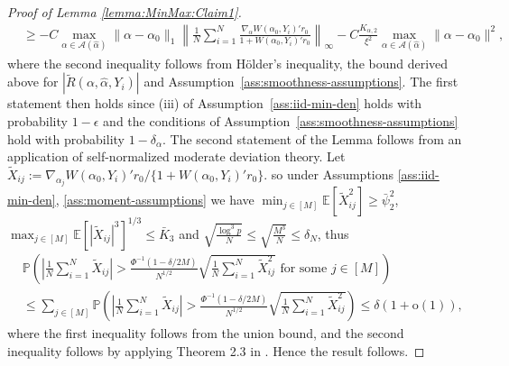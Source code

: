 \documentclass[11pt]{article}
\begin{document}
\begin{proof}[Proof of Lemma \ref{lemma:MinMax:Claim1}]
$$\begin{array}{rl}
&\displaystyle \geq -C\max_{\alpha \in \mathcal{A}(\hat\alpha)} \|\alpha-\alpha_0\|_1 \left\|\frac{1}{N}\sum_{i=1}^N \frac{\nabla_\alpha W(\alpha_0,Y_i)'r_0}{1+W(\alpha_0,Y_i)'r_0}  \right\|_\infty - C\frac{K_{\alpha,2}}{\xi^2}\max_{\alpha \in \mathcal{A}(\hat\alpha)} \|\alpha-\alpha_0\|^2,
\end{array}$$
where the second inequality follows from H\"older's inequality, the bound derived above for $|\widetilde R(\alpha,\hat\alpha,Y_i)|$ and Assumption~\ref{ass:smoothness-assumptions}. The first statement then holds since (iii) of Assumption~\ref{ass:iid-min-den} holds with probability $1-\epsilon$ and the conditions of Assumption~\ref{ass:smoothness-assumptions} hold with probability $1-\delta_{\alpha}$. The second statement of the Lemma follows from an application of self-normalized moderate deviation theory.  Let $\tilde X_{ij} := \nabla_{\alpha_j} W(\alpha_0,Y_i)'r_0 / \{1+W(\alpha_0,Y_i)'r_0\}$. so under Assumptions \ref{ass:iid-min-den}, \ref{ass:moment-assumptions} we have $\min_{j\in[M]}\mathbb{E}[\tilde X_{ij}^2 ] \geq \bar\psi_2^2 $, $\max_{j\in[M]}\mathbb{E}[ |\tilde X_{ij}|^3 ]^{1/3} \leq \bar K_3$ and $\sqrt{\frac{\log^3p}{N}}\leq\sqrt{\frac{M^3}{N}}\leq\delta_N$, thus 
$$\begin{array}{rl}
&\displaystyle \mathbb{P} \left( \left| \frac{1}{N}\sum_{i=1}^N \tilde X_{ij} \right| > \frac{\Phi^{-1}(1-\delta/2M)}{N^{1/2}} \sqrt{\frac{1}{N}\sum_{i=1}^N \tilde X_{ij}^2}\mbox{ for some }j\in[M]\right)  \\
&\displaystyle \leq  \sum_{j\in [M]} \mathbb{P} \left( \left|\frac{1}{N}\sum_{i=1}^N\tilde X_{ij} \right| >\frac{\Phi^{-1}(1-\delta/2M)}{N^{1/2}}\sqrt{\frac{1}{N}\sum_{i=1}^N \tilde X_{ij}^2}\right)\leq \delta(1+\mathrm{o}(1)),
\end{array}$$
where the first inequality follows from the union bound, and the second inequality follows by applying Theorem 2.3 in \citet{jing2003self}. Hence the result follows.
\end{proof}
\end{document}

